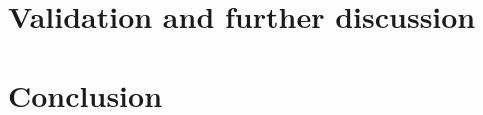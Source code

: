 \documentclass[letter, 12pt]{report}
\begin{document}
\chapter{Validation and further discussion}
\label{sec:validation}


\chapter{Conclusion}
\label{sec:conclusion}


\appendix

\renewcommand{\contentsname}{Index}
\renewcommand{\listtablename}{Index of Tables}
\renewcommand{\listfigurename}{Index of Figures}
\renewcommand{\appendixname}{Apendix}
\renewcommand{\tablename}{Table}
\renewcommand{\bibname}{Bibliography}


\end{document}
